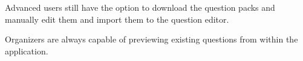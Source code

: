 \begin{section}
\begin{subsection}
        Advanced users still have the option to download the question packs and manually
        edit them and import them to the question editor.
        
        Organizers are always capable of previewing existing questions from within the
        application.
    \end{subsection}
    
\end{section}